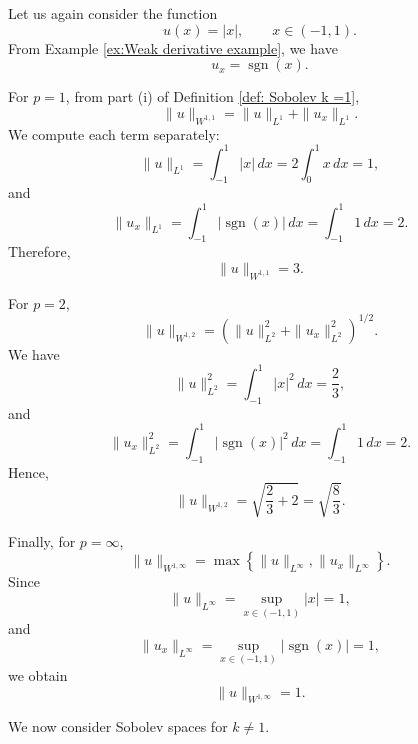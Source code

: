 \begin{example}
\label{ex:Sobolev Norm example}
    Let us again consider the function
    \[
        u(x)=|x|, \qquad x\in(-1,1).
    \]
    From Example \ref{ex:Weak derivative example}, we have
    \[
        u_x=\operatorname{sgn}(x).
    \]

    For \(p=1\), from part (i) of Definition \ref{def: Sobolev k =1},
    \[
        \|u\|_{W^{1,1}}
        =
        \|u\|_{L^1}+\|u_x\|_{L^1}.
    \]
    We compute each term separately:
    \[
        \|u\|_{L^1}
        =
        \int_{-1}^1 |x|\,dx
        =
        2\int_0^1 x\,dx
        =
        1,
    \]
    and
    \[
        \|u_x\|_{L^1}
        =
        \int_{-1}^1 |\operatorname{sgn}(x)|\,dx
        =
        \int_{-1}^1 1\,dx
        =
        2.
    \]
    Therefore,
    \[
        \|u\|_{W^{1,1}}=3.
    \]

    For \(p=2\),
    \[
        \|u\|_{W^{1,2}}
        =
        \left(
        \|u\|_{L^2}^2+\|u_x\|_{L^2}^2
        \right)^{1/2}.
    \]
    We have
    \[
        \|u\|_{L^2}^2
        =
        \int_{-1}^1 |x|^2\,dx
        =
        \frac{2}{3},
    \]
    and
    \[
        \|u_x\|_{L^2}^2
        =
        \int_{-1}^1 |\operatorname{sgn}(x)|^2\,dx
        =
        \int_{-1}^1 1\,dx
        =
        2.
    \]
    Hence,
    \[
        \|u\|_{W^{1,2}}
        =
        \sqrt{\frac{2}{3}+2}
        =
        \sqrt{\frac{8}{3}}.
    \]
    
    Finally, for \(p=\infty\),
    \[
        \|u\|_{W^{1,\infty}}
        =
        \max\left\{
            \|u\|_{L^\infty},
            \|u_x\|_{L^\infty}
        \right\}.
    \]
    Since
    \[
        \|u\|_{L^\infty}
        =
        \operatorname*{sup}_{x\in(-1,1)} |x|
        =
        1,
    \]
    and
    \[
        \|u_x\|_{L^\infty}
        =
        \operatorname*{sup}_{x\in(-1,1)}
        |\operatorname{sgn}(x)|
        =
        1,
    \]
    we obtain
    \[
        \|u\|_{W^{1,\infty}}=1.
    \]
\end{example}

We now consider Sobolev spaces for $k \neq 1$. 

